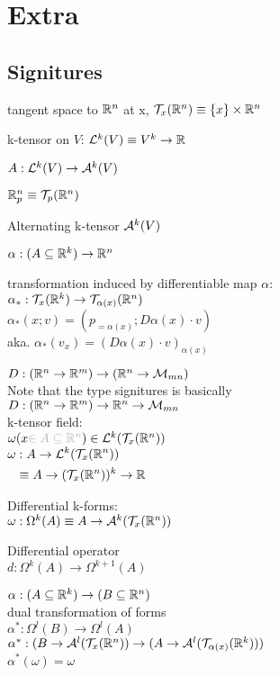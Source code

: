 
\section{Extra}
\subsection{Signitures}


tangent space to ${\mathbb R}^n$ at x, ${\mathcal T}_x({\mathbb R}^n) \equiv \{x\}\times {\mathbb R}^n$

k-tensor on $V$: ${\mathcal L}^k(V) \equiv V^k \to {\mathbb R}$

$A:{\mathcal L}^k(V)\to{\mathcal A}^k(V)$

${\mathbb R}_p^n\equiv {\mathcal T}_p({\mathbb R}^n)$

Alternating k-tensor ${\mathcal A}^k(V)$

$\alpha:(A\subseteq{\mathbb R}^k)\to{\mathbb R}^n$

transformation induced by differentiable map $\alpha$:\\
$\alpha_*:{\mathcal T}_x({\mathbb R}^k)\to{\mathcal T}_{\alpha(x)}({\mathbb R}^n)$\\
$\alpha_*(x;v) = (p_{=\alpha(x)};D\alpha(x)\cdot v)$\\
aka. $\alpha_*(v_x) = (D\alpha(x)\cdot v)_{\alpha(x)}$

$D:({\mathbb R}^n\to{\mathbb R}^m)\to({\mathbb R}^n \to {\mathcal M}_{mn})$\\
Note that the type signitures is basically\\
$D:({\mathbb R}^n\to{\mathbb R}^m)\to {\mathbb R}^n \to {\mathcal M}_{mn}$\\

k-tensor field:\\
$\omega(x \extranote{\in A\subseteq\bR^n})\in\cL^k(\cT_x(\bR^n))$\\
$\begin{aligned}
\omega&:A \to {\mathcal L}^k({\mathcal T}_x({\mathbb R}^n))\\
  &\equiv A \to ({\mathcal T}_x({\mathbb R}^n))^k \to {\mathbb R}
\end{aligned}$


Differential k-forms:\\
$
\omega:\Omega^k(A)
  \equiv A \to {\mathcal A}^k({\mathcal T}_x({\mathbb R}^n))
$\\


Differential operator\\
$d:\Omega^k(A)\to\Omega^{k+1}(A)$


$\alpha:(A\subseteq{\mathbb R}^k)\to(B\subseteq{\mathbb R}^n)$\\
dual transformation of forms\\
$\alpha^*:\Omega^l(B)\to\Omega^l(A)$\\
$\alpha^*:(B \to {\mathcal A}^l({\mathcal T}_x({\mathbb R}^n))\to(A \to {\mathcal A}^l({\mathcal T}_{\alpha(x)}({\mathbb R}^k)))$\\
$\alpha^*(\omega) = \omega $